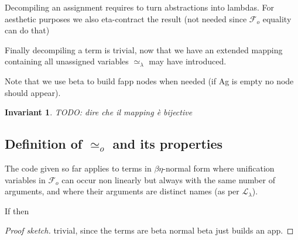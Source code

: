 \documentclass[sigconf,natbib=false,review]{acmart}
\newtheorem{invariant}{Invariant}
\newcommand{\UnifRel}{\ensuremath{\simeq}}
\newcommand{\Uo}{\ensuremath{\UnifRel_o}\xspace}
\newcommand{\Ue}{\ensuremath{\UnifRel_\lambda}\xspace}
\newcommand{\llambda}{\ensuremath{\mathcal{L}_\lambda}\xspace}
\newcommand{\Fo}{\ensuremath{\mathcal{F}_{\!o}\xspace}} %
\begin{document}



\noindent
Decompiling an assignment requires to turn abstractions into
lambdas. For aesthetic purposes we also eta-contract the result
(not needed since \Fo{} equality can do that)



\noindent
Finally decompiling a term is trivial, now that we have an extended
mapping containing all unassigned variables \Ue may have introduced.



\noindent
Note that we use beta to build fapp nodes when needed (if Ag is empty
no  node should appear).


\begin{invariant}

  TODO: dire che il mapping è bijective
  \label{inv:map-bijective}
\end{invariant}

\subsection{Definition of \Uo and its properties}



The code given so far applies to terms in $\beta\eta$-normal form where
unification variables in \Fo{} can occur non linearly but always with
the same number of arguments, and where their arguments are distinct names
(as per \llambda).

\begin{lemma} If
   then 
\end{lemma}
\begin{proof}[Proof sketch]
trivial, since the terms are beta normal beta just builds an app. 
\end{proof}
\end{document}
